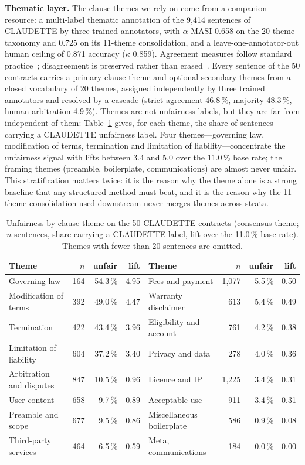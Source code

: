 \documentclass{IOS-Book-Article}
\newcommand{\corpus}{CLAUDETTE}
\begin{document}
\textbf{Thematic layer.} The clause themes we rely on come from a companion resource: a multi-label thematic annotation of the 9,414 sentences of \corpus{} by three trained annotators, with $\alpha$-MASI 0.658 on the 20-theme taxonomy and 0.725 on its 11-theme consolidation, and a leave-one-annotator-out human ceiling of 0.871 accuracy ($\kappa$ 0.859). Agreement measures follow standard practice~\cite{krippendorff2018content,passonneau2006masi,artstein2008intercoder}; disagreement is preserved rather than erased~\cite{braun2024differ}. Every sentence of the 50 contracts carries a primary clause theme and optional secondary themes from a closed vocabulary of 20 themes, assigned independently by three trained annotators and resolved by a cascade (strict agreement 46.8\,\%, majority 48.3\,\%, human arbitration 4.9\,\%). Themes are not unfairness labels, but they are far from independent of them: Table~\ref{tab:themes} gives, for each theme, the share of sentences carrying a \corpus{} unfairness label. Four themes---governing law, modification of terms, termination and limitation of liability---concentrate the unfairness signal with lifts between 3.4 and 5.0 over the 11.0\,\% base rate; the framing themes (preamble, boilerplate, communications) are almost never unfair. This stratification matters twice: it is the reason why the theme alone is a strong baseline that any structured method must beat, and it is the reason why the 11-theme consolidation used downstream never merges themes across strata.

\begin{table}[t]
\caption{Unfairness by clause theme on the 50 \corpus{} contracts (consensus theme; $n$ sentences, share carrying a \corpus{} label, lift over the 11.0\,\% base rate). Themes with fewer than 20 sentences are omitted.}
\label{tab:themes}
\centering
\footnotesize\setlength{\tabcolsep}{3.5pt}%
\begin{tabular}{@{}lrrr@{\quad}lrrr@{}}
\toprule
Theme & $n$ & unfair & lift & Theme & $n$ & unfair & lift \\
\midrule
Governing law & 164 & 54.3\,\% & 4.95 & Fees and payment & 1,077 & 5.5\,\% & 0.50 \\
Modification of terms & 392 & 49.0\,\% & 4.47 & Warranty disclaimer & 613 & 5.4\,\% & 0.49 \\
Termination & 422 & 43.4\,\% & 3.96 & Eligibility and account & 761 & 4.2\,\% & 0.38 \\
Limitation of liability & 604 & 37.2\,\% & 3.40 & Privacy and data & 278 & 4.0\,\% & 0.36 \\
Arbitration and disputes & 847 & 10.5\,\% & 0.96 & Licence and IP & 1,225 & 3.4\,\% & 0.31 \\
User content & 658 & 9.7\,\% & 0.89 & Acceptable use & 911 & 3.4\,\% & 0.31 \\
Preamble and scope & 677 & 9.5\,\% & 0.86 & Miscellaneous boilerplate & 586 & 0.9\,\% & 0.08 \\
Third-party services & 464 & 6.5\,\% & 0.59 & Meta, communications & 184 & 0.0\,\% & 0.00 \\
\bottomrule
\end{tabular}
\end{table}
\end{document}

